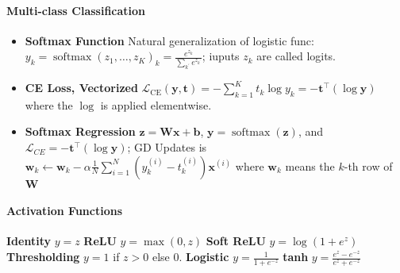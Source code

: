 \documentclass[10pt]{article}
\newcommand{\bb}{\mathbf{b}}
\newcommand{\bw}{\mathbf{w}}
\newcommand{\bx}{\mathbf{x}}
\newcommand{\by}{\mathbf{y}}
\newcommand{\bz}{\mathbf{z}}
\begin{document}
\paragraph{Multi-class Classification}
\begin{itemize}
    \setlength\itemsep{-0.45em}
    \item \textbf{Softmax Function} Natural generalization of logistic func: $y_{k}=\operatorname{softmax}\left(z_{1}, \ldots, z_{K}\right)_{k}=\frac{e^{z_{k}}}{\sum_{k^{\prime}} e^{z_{k^{\prime}}}}$; iuputs $z_k$ are called logits. 
    \item \textbf{CE Loss, Vectorized} $\mathcal{L}_{\mathrm{CE}}(\mathbf{y}, \mathbf{t})=-\sum_{k=1}^{K} t_{k} \log y_{k} =-\mathbf{t}^{\top}(\log \mathbf{y})$ where the $\log $ is applied elementwise.
    \item \textbf{Softmax Regression} $\bz = \mathbf{W}\bx + \bb$, $\by = \operatorname{softmax}(\bz)$, and $\mathcal{L}_{CE} = -\mathbf{t}^{\top}(\log \mathbf{y})$; GD Updates is $\mathbf{w}_{k} \leftarrow \mathbf{w}_{k}-\alpha \frac{1}{N} \sum_{i=1}^{N}\left(y_{k}^{(i)}-t_{k}^{(i)}\right) \mathbf{x}^{(i)}$ where $\bw_k$ means the $k$-th row of $\mathbf{W}$
\end{itemize}

\paragraph{Activation Functions} \textbf{Identity} $y = z$ \textbf{ReLU} $y = \max (0, z)$ \textbf{Soft ReLU} $y = \log(1+e^z)$ \textbf{Thresholding} $y = 1$ if $z> 0$ else $0$. \textbf{Logistic} $y=\frac{1}{1+e^{-z}}$ \textbf{tanh} $y=\frac{e^{z}-e^{-z}}{e^{z}+e^{-z}}$
\end{document}
